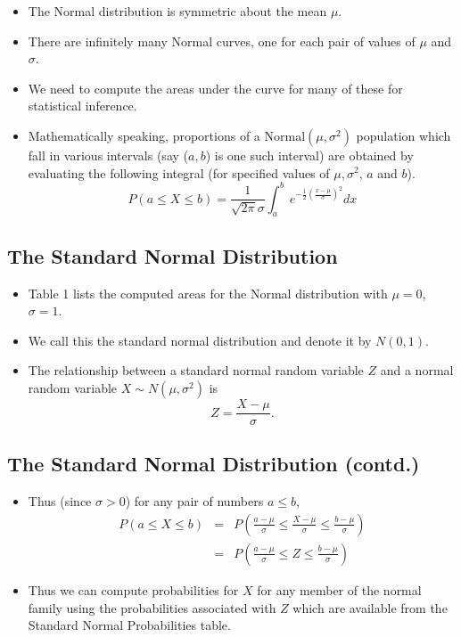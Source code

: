 \documentclass[
  letterpaper,
  DIV=11,
  numbers=noendperiod]{scrartcl}
\begin{document}
\begin{itemize}
\item
  The Normal distribution is symmetric about the mean \(\mu\).
\item
  There are infinitely many Normal curves, one for each pair of values
  of \(\mu\) and \(\sigma\).
\item
  We need to compute the areas under the curve for many of these for
  statistical inference.
\item
  Mathematically speaking, proportions of a Normal\((\mu, \sigma^2)\)
  population which fall in various intervals (say (\(a,b\)) is one such
  interval) are obtained by evaluating the following integral (for
  specified values of \(\mu, \sigma^2\), \(a\) and \(b\)).
  \[\begin{equation*}
    P(a \leq X \leq b) = \frac{1}{\sqrt{2\pi}\sigma}
    \int_a^b \, e^{-\frac{1}{2}\left(\frac{x-\mu}{\sigma}\right)^2} dx
  \end{equation*}\]
\end{itemize}

\subsection{The Standard Normal
Distribution}\label{the-standard-normal-distribution}

\begin{itemize}
\item
  Table 1 lists the computed areas for the Normal distribution with
  \(\mu = 0\), \(\sigma = 1\).
\item
  We call this the {standard normal distribution} and denote it by
  \(N(0,1)\).~
\item
  The relationship between a standard normal random variable \(Z\) and a
  normal random variable \(X \sim N(\mu, \sigma^2)\) is
  \[Z = \frac{X-\mu}{\sigma}.\]
\end{itemize}

\subsection{The Standard Normal Distribution
(contd.)}\label{the-standard-normal-distribution-contd.}

\begin{itemize}
\item
  Thus (since \(\sigma > 0\)) for any pair of numbers \(a \leq b\),
  \[\begin{eqnarray*}
       P(a \leq X \leq b) & = & P(\frac{a-\mu}{\sigma} \leq
  \frac{X-\mu}{\sigma} \leq \frac{b-\mu}{\sigma})\\
             & = & P(\frac{a-\mu}{\sigma} \leq
  Z \leq \frac{b-\mu}{\sigma})
  \end{eqnarray*}\]
\item
  Thus we can compute probabilities for \(X\) for any member of the
  normal family using the probabilities associated with \(Z\) which are
  available from the Standard Normal Probabilities table.
\end{itemize}
\end{document}
